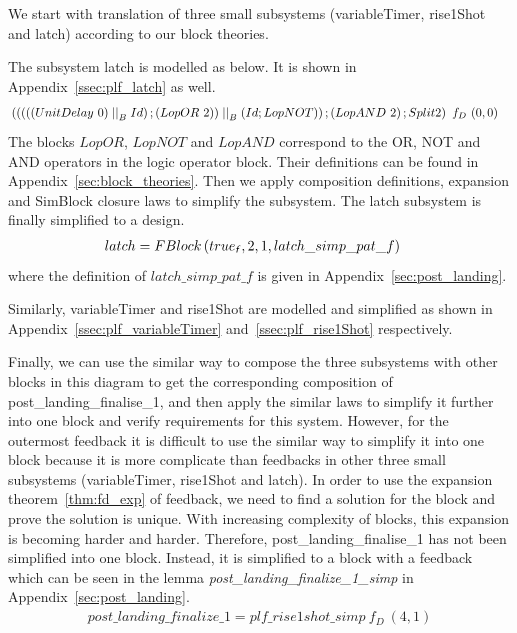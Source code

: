We start with translation of three small subsystems (\textsf{variableTimer}, \textsf{rise1Shot} and \textsf{latch}) according to our block theories. 

The subsystem \textsf{latch} is modelled as below. It is shown in Appendix~\ref{ssec:plf_latch} as well.
\begin{align*}
   & \left(\left(\left(\left((UnitDelay~0) \parallel_B Id\right) \dcomp (LopOR~2) \right) \parallel_B \left(Id \dcomp LopNOT\right) \right) \dcomp \left(LopAND~2\right) \dcomp Split2 \right)\ f_D\ (0,0) &
\end{align*}
The blocks $LopOR$, $LopNOT$ and $LopAND$ correspond to the OR, NOT and AND operators in the logic operator block. Their definitions can be found in Appendix~\ref{sec:block_theories}.  Then we apply composition definitions, expansion and SimBlock closure laws to simplify the subsystem. The \textsf{latch} subsystem is finally simplified to a design.
\begin{align*}
    & latch = FBlock \left( \logtrue{f}, 2, 1, latch\_simp\_pat\_f\right) &
\end{align*}
where the definition of $latch\_simp\_pat\_f$ is given in Appendix~\ref{sec:post_landing}. 

Similarly, \textsf{variableTimer} and \textsf{rise1Shot} are modelled and simplified as shown in Appendix~\ref{ssec:plf_variableTimer} and~\ref{ssec:plf_rise1Shot} respectively. 

Finally, we can use the similar way to compose the three subsystems with other blocks in this diagram to get the corresponding composition of \textsf{post\_landing\_finalise\_1}, and then apply the similar laws to simplify it further into one block and verify requirements for this system. However, for the outermost feedback it is difficult to use the similar way to simplify it into one block because it is more complicate than feedbacks in other three small subsystems (\textsf{variableTimer}, \textsf{rise1Shot} and \textsf{latch}). In order to use the expansion theorem~\ref{thm:fd_exp} of feedback, we need to find a solution for the block and prove the solution is unique. With increasing complexity of blocks, this expansion is becoming harder and harder. Therefore, \textsf{post\_landing\_finalise\_1} has not been simplified into one block. Instead, it is simplified to a block with a feedback which can be seen in the lemma \emph{post\_landing\_finalize\_1\_simp} in Appendix~\ref{sec:post_landing}.
\begin{align*}
  & post\_landing\_finalize\_1 = plf\_rise1shot\_simp\ f_D\ (4, 1) &
\end{align*}

